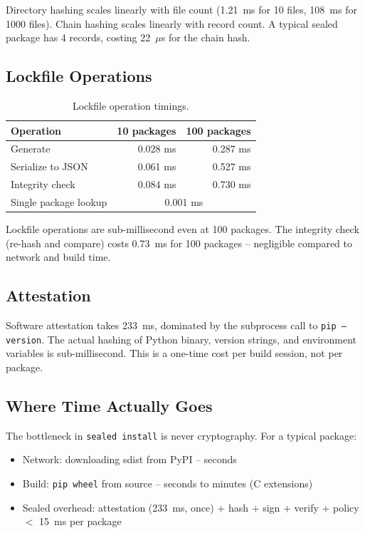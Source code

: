\documentclass[11pt,a4paper]{article}
\begin{document}
Directory hashing scales linearly with file count (1.21~ms for 10 files, 108~ms for 1000 files). Chain hashing scales linearly with record count. A typical sealed package has 4 records, costing 22~$\mu$s for the chain hash.

\subsection{Lockfile Operations}

\begin{table}[h]
\centering
\caption{Lockfile operation timings.}
\label{tab:lockfile}
\begin{tabular}{lrr}
\toprule
\textbf{Operation} & \textbf{10 packages} & \textbf{100 packages} \\
\midrule
Generate & 0.028 ms & 0.287 ms \\
Serialize to JSON & 0.061 ms & 0.527 ms \\
Integrity check & 0.084 ms & 0.730 ms \\
Single package lookup & \multicolumn{2}{c}{0.001 ms} \\
\bottomrule
\end{tabular}
\end{table}

Lockfile operations are sub-millisecond even at 100 packages. The integrity check (re-hash and compare) costs 0.73~ms for 100 packages -- negligible compared to network and build time.

\subsection{Attestation}

Software attestation takes 233~ms, dominated by the subprocess call to \texttt{pip --version}. The actual hashing of Python binary, version strings, and environment variables is sub-millisecond. This is a one-time cost per build session, not per package.

\subsection{Where Time Actually Goes}

The bottleneck in \texttt{sealed install} is never cryptography. For a typical package:

\begin{itemize}
  \item Network: downloading sdist from PyPI -- seconds
  \item Build: \texttt{pip wheel} from source -- seconds to minutes (C extensions)
  \item Sealed overhead: attestation (233~ms, once) + hash + sign + verify + policy $<$ 15~ms per package
\end{itemize}
\end{document}
